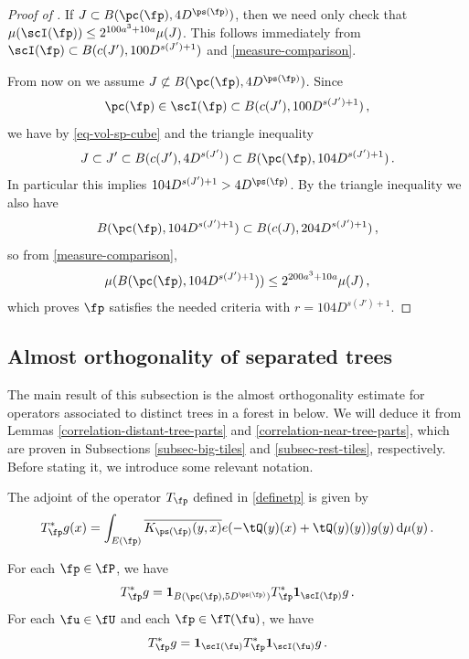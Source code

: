 \begin{proof}[Proof of ]
    If $J \subset B(\pc(\fp), 4 D^{\ps(\fp)})$, then we need only check that
    $\mu(\scI(\fp)) \le 2^{100a^3 + 10a} \mu(J)$. This follows immediately from
    $\scI(\fp) \subset B(c(J'), 100 D^{s(J') + 1})$ and \eqref{measure-comparison}.

    From now on we assume $J \not \subset B(\pc(\fp), 4 D^{\ps(\fp)})$. Since
    \begin{equation*}
        \pc(\fp) \in \scI(\fp) \subset B(c(J'), 100 D^{s(J') + 1})\, ,
    \end{equation*}
    we have by \eqref{eq-vol-sp-cube} and the triangle inequality
    $$
        J \subset J' \subset B(c(J'), 4D^{s(J')}) \subset B(\pc(\fp), 104 D^{s(J') + 1})\,.
    $$
    In particular this implies $104 D^{s(J') + 1} > 4D^{\ps(\fp)}$. By the triangle inequality
    we also have
    $$
        B(\pc(\fp), 104 D^{s(J') + 1}) \subset B(c(J), 204 D^{s(J') + 1})\,,
    $$
    so from \eqref{measure-comparison},
    $$
        \mu( B(\pc(\fp), 104 D^{s(J') + 1})) \le 2^{200a^3 + 10a} \mu(J)\,,
    $$
    which proves $\fp$ satisfies the needed criteria with $r=104 D^{s(J') + 1}$.

\end{proof}

\subsection{Almost orthogonality of separated trees}

The main result of this subsection is the almost orthogonality estimate for operators associated to distinct trees in a forest in  below. We will deduce it from Lemmas \ref{correlation-distant-tree-parts} and \ref{correlation-near-tree-parts}, which are proven in Subsections \ref{subsec-big-tiles} and \ref{subsec-rest-tiles}, respectively. Before stating it, we introduce some relevant notation.

The adjoint of the operator $T_{\fp}$ defined in \eqref{definetp} is given by
\begin{equation}
    \label{definetp*}
    T_{\fp}^* g(x) = \int_{E(\fp)} \overline{K_{\ps(\fp)}(y,x)} e(-\tQ(y)(x)+ \tQ(y)(y)) g(y) \, \mathrm{d}\mu(y)\,.
\end{equation}

\begin{lemma}
    \label{adjoint-tile-support}
    \leanok
    For each $\fp \in \fP$, we have
    $$
        T_{\fp}^* g = \mathbf{1}_{B(\pc(\fp), 5D^{\ps(\fp)})} T_{\fp}^* \mathbf{1}_{\scI(\fp)} g\,.
    $$
    For each $\fu \in \fU$ and each $\fp \in \fT(\fu)$, we have
    $$
        T_{\fp}^* g = \mathbf{1}_{\scI(\fu)} T_{\fp}^* \mathbf{1}_{\scI(\fu)} g\,.
    $$
\end{lemma}

